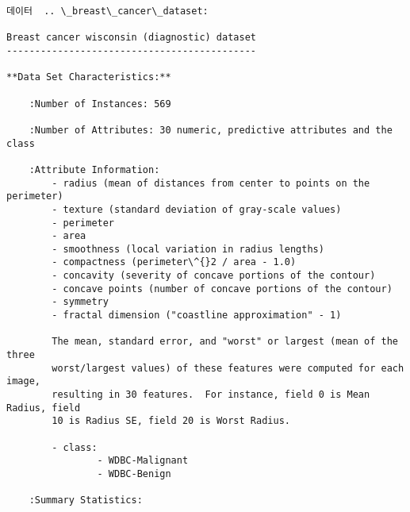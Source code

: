 \documentclass[11pt]{article}
\begin{document}
    \begin{Verbatim}[commandchars=\\\{\}]
데이터  .. \_breast\_cancer\_dataset:

Breast cancer wisconsin (diagnostic) dataset
--------------------------------------------

**Data Set Characteristics:**

    :Number of Instances: 569

    :Number of Attributes: 30 numeric, predictive attributes and the class

    :Attribute Information:
        - radius (mean of distances from center to points on the perimeter)
        - texture (standard deviation of gray-scale values)
        - perimeter
        - area
        - smoothness (local variation in radius lengths)
        - compactness (perimeter\^{}2 / area - 1.0)
        - concavity (severity of concave portions of the contour)
        - concave points (number of concave portions of the contour)
        - symmetry
        - fractal dimension ("coastline approximation" - 1)

        The mean, standard error, and "worst" or largest (mean of the three
        worst/largest values) of these features were computed for each image,
        resulting in 30 features.  For instance, field 0 is Mean Radius, field
        10 is Radius SE, field 20 is Worst Radius.

        - class:
                - WDBC-Malignant
                - WDBC-Benign

    :Summary Statistics:


\end{Verbatim}
\end{document}
